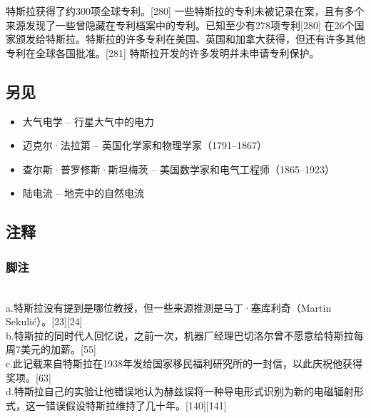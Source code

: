 特斯拉获得了约300项全球专利。[280] 一些特斯拉的专利未被记录在案，且有多个来源发现了一些曾隐藏在专利档案中的专利。已知至少有278项专利[280] 在26个国家颁发给特斯拉。特斯拉的许多专利在美国、英国和加拿大获得，但还有许多其他专利在全球各国批准。[281] 特斯拉开发的许多发明并未申请专利保护。
\subsection{另见}  
\begin{itemize}
\item 大气电学 – 行星大气中的电力  
\item 迈克尔·法拉第 – 英国化学家和物理学家（1791–1867）  
\item 查尔斯·普罗修斯·斯坦梅茨 – 美国数学家和电气工程师（1865–1923）  
\item 陆电流 – 地壳中的自然电流
\end{itemize}
\subsection{注释}  
\subsubsection{脚注}\\  
a.特斯拉没有提到是哪位教授，但一些来源推测是马丁·塞库利奇（Martin Sekulić）。[23][24]\\  
b.特斯拉的同时代人回忆说，之前一次，机器厂经理巴切洛尔曾不愿意给特斯拉每周7美元的加薪。[55]\\  
c.此记载来自特斯拉在1938年发给国家移民福利研究所的一封信，以此庆祝他获得奖项。[63]\\  
d.特斯拉自己的实验让他错误地认为赫兹误将一种导电形式识别为新的电磁辐射形式，这一错误假设特斯拉维持了几十年。[140][141]
